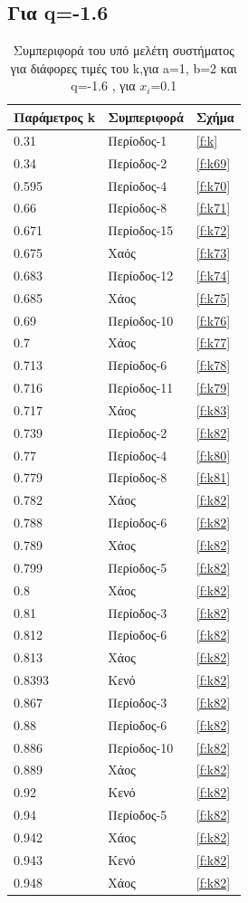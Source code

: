 \clearpage
\subsection{Για q=-1.6}


\begin{table}[h!]
	\centering
	\begin{tabular}{l | l | l}
		Παράμετρος k & Συμπεριφορά & Σχήμα\\
		\hline
		0.31 &  Περίοδος-1 & \ref{f:k}\\
		0.34 &  Περίοδος-2 & \ref{f:k69}\\
		0.595& Περίοδος-4 & \ref{f:k70}\\
		0.66& Περίοδος-8 & \ref{f:k71}\\
		0.671 &  Περίοδος-15 & \ref{f:k72}\\
		0.675& Χαός & \ref{f:k73}\\
		0.683& Περίοδος-12 & \ref{f:k74}\\
		0.685& Χάος & \ref{f:k75}\\
		0.69 &  Περίοδος-10 & \ref{f:k76}\\
		0.7 &  Χάος & \ref{f:k77}\\
		0.713 &  Περίοδος-6 & \ref{f:k78}\\
		0.716 &  Περίοδος-11 & \ref{f:k79}\\
		0.717 &  Χάος & \ref{f:k83}\\
		0.739 & Περίοδος-2&\ref{f:k82}\\
		0.77 &  Περίοδος-4 & \ref{f:k80}\\
		0.779 &  Περίοδος-8& \ref{f:k81}\\
		0.782 & Χάος&\ref{f:k82}\\
		0.788 & Περίοδος-6&\ref{f:k82}\\
		0.789 & Χάος&\ref{f:k82}\\
		0.799 & Περίοδος-5&\ref{f:k82}\\
		0.8 &Χάος&\ref{f:k82}\\
		0.81 & Περίοδος-3&\ref{f:k82}\\
		0.812 & Περίοδος-6&\ref{f:k82}\\
		0.813 & Χάος&\ref{f:k82}\\
		0.8393 & Κενό&\ref{f:k82}\\
		0.867 & Περίοδος-3&\ref{f:k82}\\
		0.88 & Περίοδος-6&\ref{f:k82}\\
		0.886 & Περίοδος-10&\ref{f:k82}\\
		0.889 & Χάος&\ref{f:k82}\\
		0.92 & Κενό&\ref{f:k82}\\
		0.94 & Περίοδος-5&\ref{f:k82}\\
		0.942 & Χάος&\ref{f:k82}\\
		0.943 & Κενό&\ref{f:k82}\\
		0.948 & Χάος&\ref{f:k82}\\
	\end{tabular}
	\caption{ Συμπεριφορά του υπό μελέτη συστήματος για διάφορες τιμές του k,για a=1, b=2 και q=-1.6 , για \(x_i\)=0.1}
	\label{tab:abc7}
\end{table}